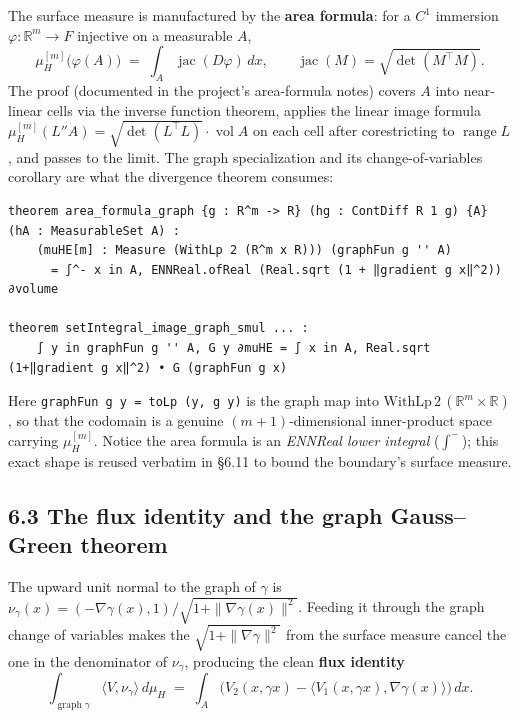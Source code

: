 ﻿\documentclass[12pt, a4paper]{article}
\renewcommand{\_}{\origunderscore\allowbreak}
\theoremstyle{definition}
\theoremstyle{plain}
\begin{document}
The surface measure is manufactured by the \textbf{area formula}: for a $C^1$ immersion
$\varphi:\mathbb{R}^m\to F$ injective on a measurable $A$,
\[
  \mu_H^{[m]}\big(\varphi(A)\big)\;=\;\int_A \operatorname{jac}(D\varphi)\,dx,
  \qquad \operatorname{jac}(M)=\sqrt{\det(M^{\!\top}M)} .
\]
The proof (documented in the project's area-formula notes) covers $A$ into near-linear cells via the
inverse function theorem, applies the linear image formula
$\mu_H^{[m]}(L''A)=\sqrt{\det(L^{\!\top}L)}\cdot\operatorname{vol}A$ on each cell after corestricting
to $\operatorname{range}L$, and passes to the limit.  The graph specialization and its
change-of-variables corollary are what the divergence theorem consumes:

\begin{lstlisting}[caption={Area formula (graph form) and vector-valued change of variables}]
theorem area_formula_graph {g : R^m -> R} (hg : ContDiff R 1 g) {A} (hA : MeasurableSet A) :
    (muHE[m] : Measure (WithLp 2 (R^m x R))) (graphFun g '' A)
      = ∫^- x in A, ENNReal.ofReal (Real.sqrt (1 + ‖gradient g x‖^2)) ∂volume

theorem setIntegral_image_graph_smul ... :
    ∫ y in graphFun g '' A, G y ∂muHE = ∫ x in A, Real.sqrt (1+‖gradient g x‖^2) • G (graphFun g x)
\end{lstlisting}

Here \texttt{graphFun g y = toLp (y, g y)} is the graph map into $\mathrm{WithLp}\,2\,
(\mathbb{R}^m\times\mathbb{R})$, so that the codomain is a genuine $(m{+}1)$-dimensional
inner-product space carrying $\mu_H^{[m]}$.  Notice the area formula is an \emph{ENNReal lower
integral} ($\int^-$); this exact shape is reused verbatim in \S6.11 to bound the boundary's surface
measure.

\subsection{6.3 The flux identity and the graph Gauss--Green theorem}

The upward unit normal to the graph of $\gamma$ is
$\nu_\gamma(x)=(-\nabla\gamma(x),1)/\sqrt{1+\|\nabla\gamma(x)\|^2}$.  Feeding it through the graph
change of variables makes the $\sqrt{1+\|\nabla\gamma\|^2}$ from the surface measure cancel the one
in the denominator of $\nu_\gamma$, producing the clean \textbf{flux identity}
\[
  \int_{\operatorname{graph}\gamma}\langle V,\nu_\gamma\rangle\,d\mu_H
    \;=\;\int_A\Big(V_2(x,\gamma x)-\big\langle V_1(x,\gamma x),\nabla\gamma(x)\big\rangle\Big)\,dx .
\]
\end{document}
